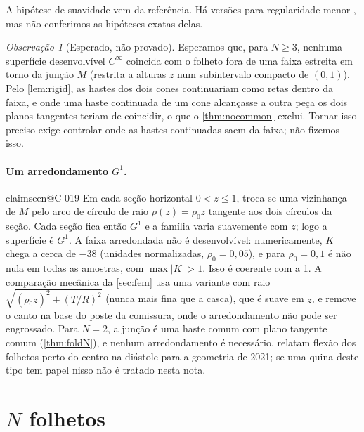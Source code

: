 \documentclass[11pt,a4paper]{article}
\makeatletter
\theoremstyle{plain}
\theoremstyle{remark}
\newtheorem{remark}[theorem]{Observação}
\newcommand{\claim}[1]{\ifcsname claimseen@#1\endcsname\else\expandafter\gdef\csname claimseen@#1\endcsname{}\label{claim:#1}\fi}
\makeatother
\begin{document}
A hipótese de suavidade vem da referência. Há versões para regularidade menor \citep[por exemplo,][]{HartmanNirenberg1959},
mas não conferimos as hipóteses exatas delas.

\begin{remark}[Esperado, não provado]\label{rem:expected}
Esperamos que, para $N\ge3$, nenhuma superfície desenvolvível $C^\infty$ coincida com o folheto fora de uma faixa estreita em
torno da junção $M$ (restrita a alturas $z$ num subintervalo compacto de $(0,1)$). Pelo \cref{lem:rigid}, as hastes dos dois
cones continuariam como retas dentro da faixa, e onde uma haste continuada de um cone alcançasse a outra peça os dois planos
tangentes teriam de coincidir, o que o \cref{thm:nocommon} exclui. Tornar isso preciso exige controlar onde as hastes
continuadas saem da faixa; não fizemos isso.
\end{remark}

\paragraph{Um arredondamento $G^1$.}\claim{C-019} Em cada seção horizontal $0<z\le1$, troca-se uma vizinhança de $M$ pelo arco
de círculo de raio $\rho(z)=\rho_0 z$ tangente aos dois círculos da seção. Cada seção fica então $G^1$ e a família varia
suavemente com $z$; logo a superfície é $G^1$. A faixa arredondada não é desenvolvível: numericamente, $K$ chega a cerca de
$-38$ (unidades normalizadas, $\rho_0=0{,}05$), e para $\rho_0=0{,}1$ é não nula em todas as amostras, com $\max|K|>1$. Isso é
coerente com a \cref{rem:expected}. A comparação mecânica da \cref{sec:fem} usa uma variante com raio
$\sqrt{(\rho_0z)^2+(T/R)^2}$ (nunca mais fina que a casca), que é suave em $z$, e remove o canto na base do poste da
comissura, onde o arredondamento não pode ser engrossado. Para $N=2$, a junção é uma haste comum com plano tangente comum
(\cref{thm:foldN}), e nenhum arredondamento é necessário. \citet{Oliveira2024} relatam flexão dos folhetos perto do centro na
diástole para a geometria de 2021; se uma quina deste tipo tem papel nisso não é tratado nesta nota.

\section{$N$ folhetos}\label{sec:N}
\end{document}
